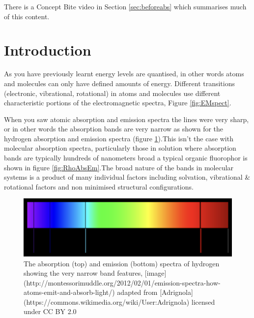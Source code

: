 \documentclass[
]{book}
\begin{document}
There is a Concept Bite video in Section \ref{sec:beforeabs} which summarises much of this content.

\hypertarget{sec:AbsIntro}{%
\section{Introduction}\label{sec:AbsIntro}}

As you have previously learnt energy levels are quantised, in other words atoms and molecules can only have defined amounts of energy. Different transitions (electronic, vibrational, rotational) in atoms and molecules use different characteristic portions of the electromagnetic spectra, Figure \ref{fig:EMspect}.

When you saw atomic absorption and emission spectra the lines were very sharp, or in other words the absorption bands are very narrow as shown for the hydrogen absorption and emission spectra (figure \ref{fig:HAbsEm}).This isn't the case with molecular absorption spectra, particularly those in solution where absorption bands are typically hundreds of nanometers broad a typical organic fluorophor is shown in figure \ref{fig:RhoAbsEm}.The broad nature of the bands in molecular systems is a product of many individual factors including solvation, vibrational \& rotational factors and non minimised structural configurations.

\begin{figure}

{\centering \includegraphics[width=0.7\linewidth]{images/HAbsEm} 

}

\caption{The absorption (top) and emission (bottom) spectra of hydrogen showing the very narrow band features, [image](http://montessorimuddle.org/2012/02/01/emission-spectra-how-atoms-emit-and-absorb-light/) adapted from [Adrignola](https://commons.wikimedia.org/wiki/User:Adrignola) licensed under CC BY 2.0}\label{fig:HAbsEm}
\end{figure}
\end{document}
